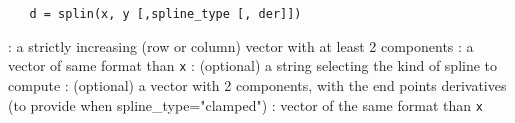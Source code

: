 
\begin{mandesc}
\end{mandesc}

\begin{calling_sequence}
  \begin{verbatim}
   d = splin(x, y [,spline_type [, der]])
  \end{verbatim}
\end{calling_sequence}


\begin{parameters}
  \begin{varlist}
   : a strictly increasing (row or column) vector with at least 2 components
   : a vector of same format than \verb!x!
   : (optional) a string selecting the kind of spline to compute
   : (optional) a vector with 2 components, with the end points derivatives (to 
               provide when spline\_type="clamped")
   : vector of the same format than \verb!x!
  \end{varlist}
  \end{parameters}

